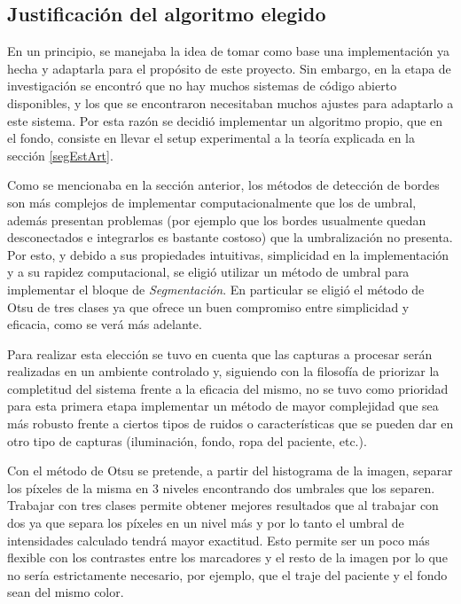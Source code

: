 


\subsection{Justificación del algoritmo elegido}

En un principio, se manejaba la idea de tomar como base una implementación ya hecha y adaptarla para el propósito de este proyecto. Sin embargo, en la etapa de investigación se encontró que no hay muchos sistemas de código abierto disponibles, y los que se encontraron necesitaban muchos ajustes para adaptarlo a este sistema. Por esta razón se decidió implementar un algoritmo propio, que en el fondo, consiste en llevar el setup experimental a la teoría explicada en la sección \ref{segEstArt}.

Como se mencionaba en la sección anterior, los métodos de detección de bordes son más complejos de implementar computacionalmente que los de umbral, además presentan problemas (por ejemplo que los bordes usualmente quedan desconectados e integrarlos es bastante costoso) que la umbralización no presenta. Por esto, y debido a sus propiedades intuitivas, simplicidad en la implementación y a su rapidez computacional, se eligió utilizar un método de umbral para implementar el bloque de \emph{Segmentación}. En particular se eligió el método de Otsu\cite{otsu} de tres clases ya que ofrece un buen compromiso entre simplicidad y eficacia, como se verá más adelante. 

Para realizar esta elección se tuvo en cuenta que las capturas a procesar serán realizadas en un ambiente controlado y, siguiendo con la filosofía de priorizar la completitud del sistema frente a la eficacia del mismo, no se tuvo como prioridad para esta primera etapa implementar un método de mayor complejidad que sea más robusto frente a ciertos tipos de ruidos o características que se pueden dar en otro tipo de capturas (iluminación, fondo, ropa del paciente, etc.). 

Con el método de Otsu\cite{otsu} se pretende, a partir del histograma de la imagen, separar los píxeles de la misma en 3 niveles encontrando dos umbrales que los separen. Trabajar con tres clases permite obtener mejores resultados que al trabajar con dos ya que separa los píxeles en un nivel más y por lo tanto el umbral de intensidades calculado tendrá mayor exactitud. Esto permite ser un poco más flexible con los contrastes entre los marcadores y el resto de la imagen por lo que no sería estrictamente necesario, por ejemplo, que el traje del paciente y el fondo sean del mismo color.

